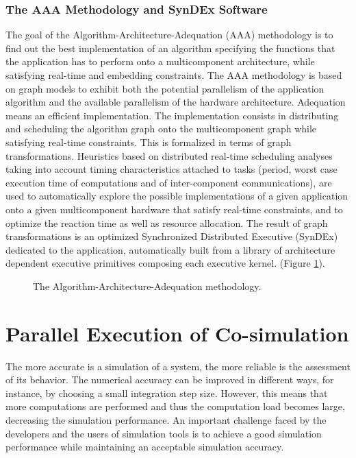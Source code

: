 \subsubsection{The AAA Methodology and SynDEx Software}

The goal of the Algorithm-Architecture-Adequation (AAA) methodology \cite{sorel:1996} is to find out the best implementation of an algorithm specifying the functions that the application has to perform onto a multicomponent architecture, while satisfying real-time and embedding constraints. The AAA methodology is based on graph models to exhibit both the potential parallelism of the application algorithm and the available parallelism of the hardware architecture.  Adequation means an efficient implementation. The implementation consists in distributing and scheduling the algorithm graph onto the multicomponent graph while satisfying real-time constraints. This is formalized in terms of graph transformations. Heuristics based on distributed real-time scheduling analyses taking into account timing characteristics attached to tasks (period, worst case execution time of computations and of inter-component communications), are used to automatically explore the possible implementations of a given application onto a given multicomponent hardware that satisfy real-time constraints, and to optimize the reaction time as well as resource allocation. The result of graph transformations is an optimized Synchronized Distributed Executive (SynDEx) dedicated to the application, automatically built from a library of architecture dependent executive primitives composing each executive kernel. (Figure \ref{fig:aaa}).

\begin{figure}[phbt]
\centering

\caption{The Algorithm-Architecture-Adequation methodology.}
\label{fig:aaa}
\end{figure} 

\section{Parallel Execution of Co-simulation}

The more accurate is a simulation of a system, the more reliable is the assessment of its behavior. The numerical accuracy can be improved in different ways, for instance, by choosing a small integration step size. However, this means that more computations are performed and thus the computation load becomes large, decreasing the simulation performance. An important challenge faced by the developers and the users of simulation tools is to achieve a good simulation performance while maintaining an acceptable simulation accuracy. 

